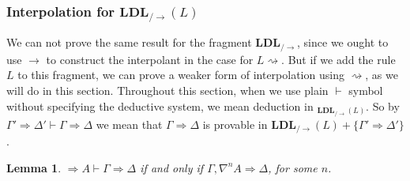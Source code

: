 \documentclass[12pt,a4paper]{article}
\theoremstyle{plain}
\newtheorem{lem}[thm]{Lemma}
\theoremstyle{definition}
\begin{document}
\subsubsection{Interpolation for $\mathbf{LDL}_{/\rightarrow}(L)$}
We can not prove the same result for the fragment $\mathbf{LDL}_{/\rightarrow}$, since we ought to use $\rightarrow$ to construct the interpolant in the case for $L\rightsquigarrow$. But if we add the rule $L$ to this fragment, we can prove a weaker form of interpolation using $\rightsquigarrow$, as we will do in this section.
Throughout this section, when we use plain $\vdash$ symbol without specifying the deductive system, we mean deduction in $_{\mathbf{LDL}_{/\rightarrow}(L)}$. So by $\Gamma' \Rightarrow \Delta' \vdash \Gamma \Rightarrow \Delta$ we mean that $\Gamma \Rightarrow \Delta$ is provable in $\mathbf{LDL}_{/\rightarrow}(L)+\{\Gamma' \Rightarrow \Delta'\}$.
\begin{lem}
	\label{lem:vdash} $\Rightarrow A \vdash \Gamma \Rightarrow \Delta$ if and only if $\Gamma, \nabla^n A \Rightarrow \Delta$, for some $n$.
\end{lem}
\end{document}
